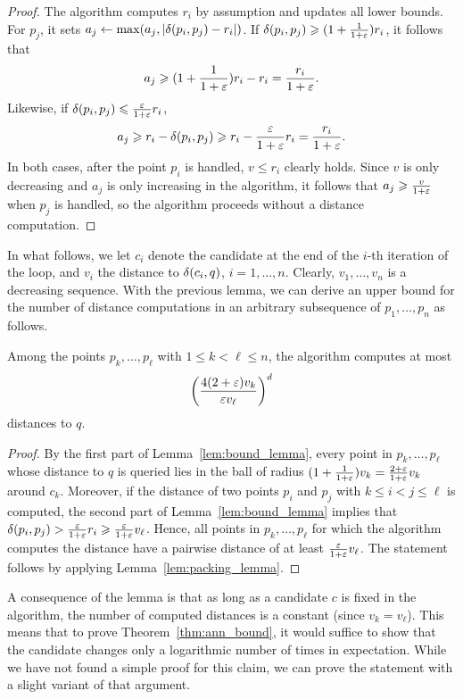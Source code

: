\documentclass[a4paper,UKenglish,cleveref, autoref]{lipics-v2019}
\begin{document}
\begin{proof}
The algorithm computes $r_i$ by assumption and updates
all lower bounds. For $p_j$, it sets $a_j\gets \max (a_j,|\delta(p_i,p_j)-r_i|)$.
If $\delta(p_i,p_j)\geqslant (1+\frac{1}{1+\varepsilon})r_i$, it follows that 
\[a_j\geqslant (1+\frac{1}{1+\varepsilon})r_i - r_i = \frac{r_i}{1+\varepsilon}.\]
Likewise, if $\delta(p_i,p_j)\leqslant\frac{\varepsilon}{1+\varepsilon}r_i$,
\[a_j\geqslant r_i-\delta(p_i,p_j) \geqslant r_i - \frac{\varepsilon}{1+\varepsilon}r_i = \frac{r_i}{1+\varepsilon}.\]
In both cases, after the point $p_i$ is handled,
$v\leq r_i$ clearly holds. Since $v$ is only decreasing
and $a_j$ is only increasing in the algorithm,
it follows that $a_j\geqslant \frac{v}{1+\varepsilon}$ when $p_j$ is handled,
so the algorithm proceeds without a distance computation.
\end{proof}

In what follows, we let $c_i$ denote the candidate
at the end of the $i$-th iteration of the loop, and $v_i$
the distance to $\delta(c_i, q)$, $i = 1, \dots, n$. Clearly, $v_1,\ldots,v_n$ is a decreasing sequence.
With the previous lemma, we can derive an upper bound for the number
of distance computations in an arbitrary subsequence of $p_1,\ldots,p_n$
as follows. 

\begin{lemma}
\label{lem:sequence_lemma}
Among the points $p_k,\ldots,p_\ell$ with $1\leq k< \ell\leq n$, the algorithm computes at most
\[\left(\frac{4(2+\varepsilon) v_k}{\varepsilon v_\ell}\right)^{d}\]
distances to $q$.
\end{lemma}
\begin{proof}
By the first part of Lemma~\ref{lem:bound_lemma}, every point in $p_k,\ldots,p_\ell$
whose distance to $q$ is queried lies in the ball of radius $(1+\frac{1}{1+\varepsilon})v_k=\frac{2+\varepsilon}{1+\varepsilon} v_k$
around $c_k$. Moreover, if the distance of two points $p_i$ and $p_j$ with $k\leq i<j\leq\ell$
is computed, the second part of Lemma~\ref{lem:bound_lemma} implies that $\delta(p_i,p_j)> \frac{\varepsilon}{1+\varepsilon}r_i\geqslant \frac{\varepsilon}{1+\varepsilon}v_\ell$.
Hence, all points in $p_k,\ldots,p_\ell$ for which the algorithm computes the distance
have a pairwise distance of at least $\frac{\varepsilon}{1+\varepsilon}v_\ell$. The statement follows by applying Lemma~\ref{lem:packing_lemma}.
\end{proof}

A consequence of the lemma is that as long as a candidate $c$ is fixed in the algorithm,
the number of computed distances is a constant (since $v_k=v_\ell$). 
This means that to prove Theorem~\ref{thm:ann_bound}, it would suffice to show
that the candidate changes only a logarithmic number of times in expectation.
While we have not found a simple proof for this claim, we can prove the statement with a slight variant of
that argument.
\end{document}

